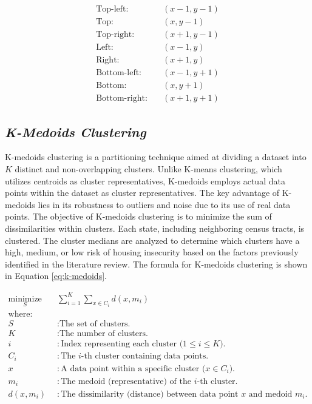 \begin{equation}
    \label{eq:queen_neighbors}
    \begin{aligned}
        \text{Top-left:} & \quad (x-1, y-1) \\
        \text{Top:} & \quad (x, y-1) \\
        \text{Top-right:} & \quad (x+1, y-1) \\
        \text{Left:} & \quad (x-1, y) \\
        \text{Right:} & \quad (x+1, y) \\
        \text{Bottom-left:} & \quad (x-1, y+1) \\
        \text{Bottom:} & \quad (x, y+1) \\
        \text{Bottom-right:} & \quad (x+1, y+1)
    \end{aligned}
\end{equation}

\subsection{\textit{K-Medoids Clustering}}
K-medoids clustering is a partitioning technique aimed at dividing a dataset into \(K\) distinct and non-overlapping clusters. Unlike K-means clustering, which utilizes centroids as cluster representatives, K-medoids employs actual data points within the dataset as cluster representatives. The key advantage of K-medoids lies in its robustness to outliers and noise due to its use of real data points. The objective of K-medoids clustering is to minimize the sum of dissimilarities within clusters. Each state, including neighboring census tracts, is clustered. The cluster medians are analyzed to determine which clusters have a high, medium, or low risk of housing insecurity based on the factors previously identified in the literature review. The formula for K-medoids clustering is shown in Equation \ref{eq:k-medoids}.

\begin{equation}\label{eq:k-medoids}
    \begin{aligned}
        \underset{S}{\text{minimize}} \quad & \sum_{i=1}^{K} \sum_{x \in C_i} d(x, m_i) \\
        \text{where:} \\
        S & : \text{The set of clusters.} \\
        K & : \text{The number of clusters.} \\
        i & : \text{Index representing each cluster (\(1 \leq i \leq K\)).} \\
        C_i & : \text{The \(i\)-th cluster containing data points.} \\
        x & : \text{A data point within a specific cluster (\(x \in C_i\)).} \\
        m_i & : \text{The medoid (representative) of the \(i\)-th cluster.} \\
        d(x, m_i) & : \text{The dissimilarity (distance) between data point \(x\) and medoid \(m_i\).}
    \end{aligned}
\end{equation}

